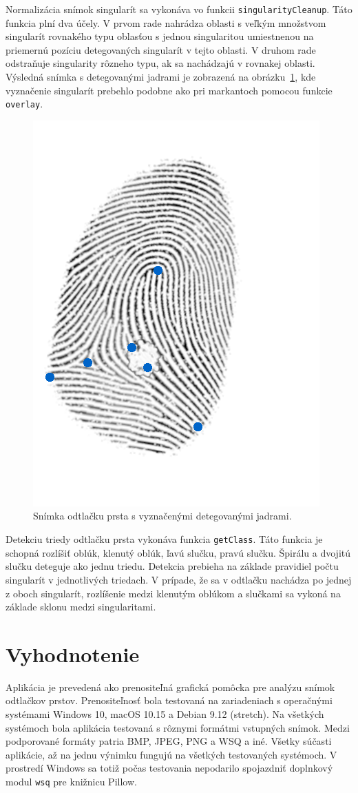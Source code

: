   Normalizácia snímok singularít sa vykonáva vo funkcii \texttt{singularityCleanup}. Táto funkcia plní dva účely. V prvom rade nahrádza oblasti s veľkým
  množstvom singularít rovnakého typu oblasťou s jednou singularitou umiestnenou na priemernú pozíciu detegovaných singularít v tejto oblasti.
  V druhom rade odstraňuje singularity rôzneho typu, ak sa nachádzajú v rovnakej oblasti. Výsledná snímka s detegovanými jadrami je zobrazená na
  obrázku~{\ref{obr:jadra}}, kde vyznačenie singularít prebehlo podobne ako pri markantoch pomocou funkcie \texttt{overlay}.

  \begin{figure}[h]
    \centering
    \includegraphics[width=0.3\linewidth]{obrazky-figures/cores.png}
    \caption{Snímka odtlačku prsta s vyznačenými detegovanými jadrami.}
    \label{obr:jadra}
  \end{figure}

  Detekciu triedy odtlačku prsta vykonáva funkcia \texttt{getClass}. Táto funkcia je schopná rozlíšiť oblúk, klenutý oblúk, ľavú slučku, pravú slučku.
  Špirálu a dvojitú slučku deteguje ako jednu triedu. Detekcia prebieha na základe pravidiel počtu singularít v jednotlivých triedach. V prípade, že sa
  v odtlačku nachádza po jednej z oboch singularít, rozlíšenie medzi klenutým oblúkom a slučkami sa vykoná na základe sklonu medzi singularitami.

  \section{Vyhodnotenie}
  Aplikácia je prevedená ako prenositeľná grafická pomôcka pre analýzu snímok odtlačkov prstov. Prenositeľnosť bola testovaná na zariadeniach s operačnými
  systémami Windows 10, macOS 10.15 a Debian 9.12 (stretch). Na všetkých systémoch bola aplikácia testovaná s rôznymi formátmi vstupných snímok. Medzi
  podporované formáty patria BMP, JPEG, PNG a WSQ a iné. Všetky súčasti aplikácie, až na jednu výnimku fungujú na všetkých testovaných systémoch. V prostredí
  Windows sa totiž počas testovania nepodarilo spojazdniť doplnkový modul \texttt{wsq} pre knižnicu Pillow.

